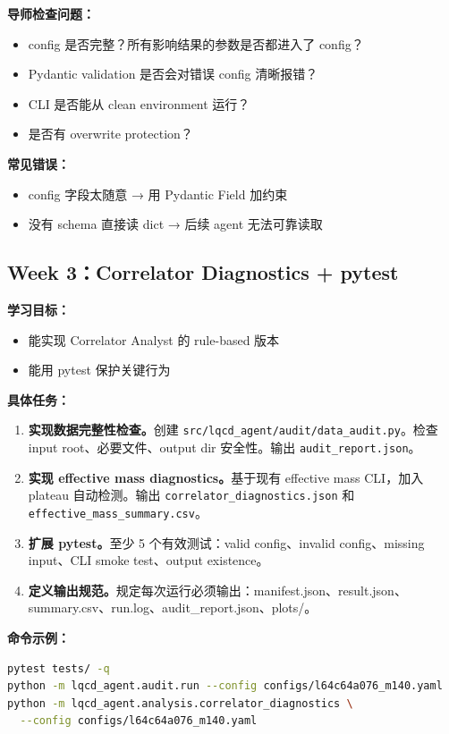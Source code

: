 \documentclass[11pt,a4paper,fontset=fandol]{ctexart}
\begin{document}
\textbf{导师检查问题：}
\begin{itemize}
  \item config 是否完整？所有影响结果的参数是否都进入了 config？
  \item Pydantic validation 是否会对错误 config 清晰报错？
  \item CLI 是否能从 clean environment 运行？
  \item 是否有 overwrite protection？
\end{itemize}

\textbf{常见错误：}
\begin{itemize}
  \item config 字段太随意 → 用 Pydantic Field 加约束
  \item 没有 schema 直接读 dict → 后续 agent 无法可靠读取
\end{itemize}

\subsection{Week 3：Correlator Diagnostics + pytest}

\textbf{学习目标：}
\begin{itemize}
  \item 能实现 Correlator Analyst 的 rule-based 版本
  \item 能用 pytest 保护关键行为
\end{itemize}

\textbf{具体任务：}
\begin{enumerate}
  \item \textbf{实现数据完整性检查。}创建 \texttt{src/lqcd\_agent/audit/data\_audit.py}。检查 input root、必要文件、output dir 安全性。输出 \texttt{audit\_report.json}。
  \item \textbf{实现 effective mass diagnostics。}基于现有 effective mass CLI，加入 plateau 自动检测。输出 \texttt{correlator\_diagnostics.json} 和 \texttt{effective\_mass\_summary.csv}。
  \item \textbf{扩展 pytest。}至少 5 个有效测试：valid config、invalid config、missing input、CLI smoke test、output existence。
  \item \textbf{定义输出规范。}规定每次运行必须输出：manifest.json、result.json、summary.csv、run.log、audit\_report.json、plots/。
\end{enumerate}

\textbf{命令示例：}
\begin{lstlisting}[language=bash]
pytest tests/ -q
python -m lqcd_agent.audit.run --config configs/l64c64a076_m140.yaml
python -m lqcd_agent.analysis.correlator_diagnostics \
  --config configs/l64c64a076_m140.yaml
\end{lstlisting}
\end{document}

